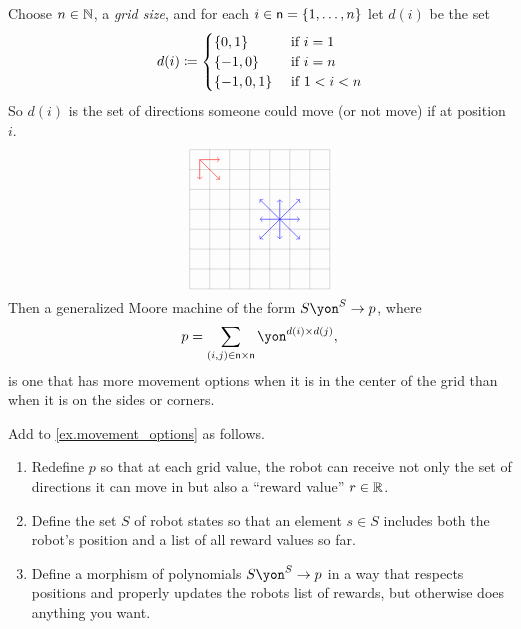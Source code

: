 \documentclass[Book-Poly]{subfiles}
\begin{document}
\begin{example}\label{ex.movement_options}
Choose $n\in\mathbb{N}$, a \emph{grid size}, and for each $i\in\mathsf{n}=\{1,\ldots,n\}$ let $d(i)$ be the set
\[
	d(i)\coloneqq
	\begin{cases}
		\{0,1\}&\textnormal{ if }i=1\\
		\{-1,0\}&\textnormal{ if }i=n\\
		\{-1,0,1\}&\textnormal{ if } 1<i<n
	\end{cases}
\]
So $d(i)$ is the set of directions someone could move (or not move) if at position $i$.
\[
\begin{tikzpicture}[scale=.5]
  \draw[step=1cm,gray,very thin] (-3,-3) grid (4,4);
	\draw[->, red ] (-2.5,3.5) -- (-1.5, 3.5);
	\draw[->, red ] (-2.5,3.5) -- (-1.5, 2.5);
	\draw[->, red ] (-2.5,3.5) -- (-2.5, 2.5);
	\draw[->, blue] (1.5, 0.5) -- (0.5, 0.5);
	\draw[->, blue] (1.5, 0.5) -- (2.5, 0.5);
	\draw[->, blue] (1.5, 0.5) -- (1.5, 1.5);
	\draw[->, blue] (1.5, 0.5) -- (1.5,-0.5);
	\draw[->, blue] (1.5, 0.5) -- (0.5, 1.5);
	\draw[->, blue] (1.5, 0.5) -- (0.5,-0.5);
	\draw[->, blue] (1.5, 0.5) -- (2.5, 1.5);
	\draw[->, blue] (1.5, 0.5) -- (2.5,-0.5);
\end{tikzpicture}
\]
Then a generalized Moore machine of the form $S\yon^S\to p$, where
\[
p= \sum_{(i,j)\in\ord{n}\times\ord{n}}\yon^{d(i)\times d(j)},
\]
is one that has more movement options when it is in the center of the grid than when it is on the sides or corners.
\end{example}

\begin{exercise}
Add to \cref{ex.movement_options} as follows.
\begin{enumerate}
	\item Redefine $p$ so that at each grid value, the robot can receive not only the set of directions it can move in but also a ``reward value'' $r\in\mathbb{R}$. 
	\item Define the set $S$ of robot states so that an element $s\in S$ includes both the robot's position and a list of all reward values so far.
	\item Define a morphism of polynomials $S\yon^S\to p$ in a way that respects positions and properly updates the robots list of rewards, but otherwise does anything you want.
\qedhere
\end{enumerate}
\end{exercise}
\end{document}
